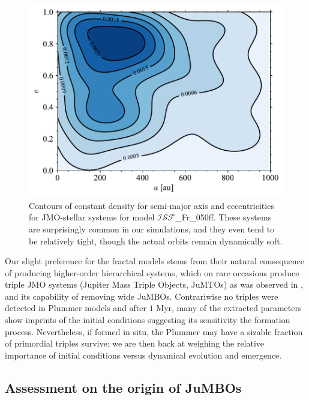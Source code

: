 \documentclass[submission,phys]{lib/SciPost}
\newcommand{\jumbos}{\mbox{JuMBOs}}
\begin{document}
   \begin{figure}
    \centering
    \includegraphics[width=0.75\columnwidth]{figures/Fractal_rvir0.5_FF_sem_ecc_mixed_systs.pdf}
    \caption{Contours of constant density for semi-major axis and
      eccentricities for JMO-stellar systems for model
      $\mathcal{ISF}$\_Fr\_050ff. These systems are surprisingly
      common in our simulations, and they even tend to be relatively
      tight, though the actual orbits remain dynamically soft.  }
    \label{Fig:MixedSys_OrbParams}
   \end{figure}

Our slight preference for the fractal models stems from their natural
consequence of producing higher-order hierarchical systems, which on
rare occasions produce triple JMO systems (Jupiter Mass Triple
Objects, JuMTOs) as was observed in \cite{2023arXiv231001231P}, and
its capability of removing wide \jumbos.  Contrariwise no triples were
detected in Plummer models and after $1$ Myr, many of the extracted
parameters show imprints of the initial conditions suggesting its
sensitivity the formation process.  Nevertheless, if formed in situ,
the Plummer may have a sizable fraction of primordial triples survive:
we are then back at weighing the relative importance of initial
conditions versus dynamical evolution and emergence.



\subsection{Assessment on the origin of \jumbos}
\end{document}
